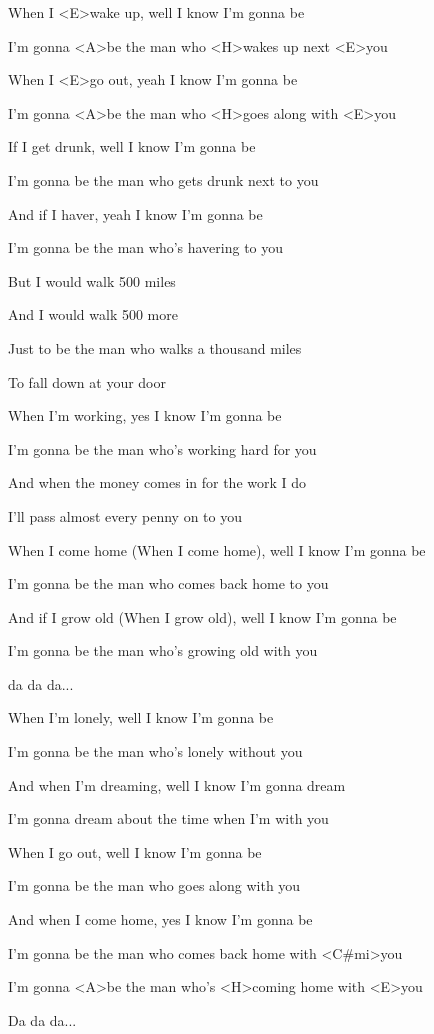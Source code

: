 

\zs
When I <E>wake up, well I know I'm gonna be

I'm gonna <A>be the man who <H>wakes up next <E>you

When I <E>go out, yeah I know I'm gonna be

I'm gonna <A>be the man who <H>goes along with <E>you

\ks

\zs
If I get drunk, well I know I'm gonna be

I'm gonna be the man who gets drunk next to you

And if I haver, yeah I know I'm gonna be

I'm gonna be the man who's havering to you
\ks

\zr
But I would walk 500 miles

And I would walk 500 more

Just to be the man who walks a thousand miles

To fall down at your door
\kr

\zs
When I'm working, yes I know I'm gonna be

I'm gonna be the man who's working hard for you

And when the money comes in for the work I do

I'll pass almost every penny on to you
\ks

\zs
When I come home (When I come home), well I know I'm gonna be

I'm gonna be the man who comes back home to you

And if I grow old (When I grow old), well I know I'm gonna be

I'm gonna be the man who's growing old with you
\ks

\zr \kr

da da da...


\zs
When I'm lonely, well I know I'm gonna be

I'm gonna be the man who's lonely without you

And when I'm dreaming, well I know I'm gonna dream

I'm gonna dream about the time when I'm with you
\ks

\zs
When I go out, well I know I'm gonna be

I'm gonna be the man who goes along with you

And when I come home, yes I know I'm gonna be

I'm gonna be the man who comes back home with <C#mi>you

I'm gonna <A>be the man who's <H>coming home with <E>you
\ks

\zr \kr

Da da da...

\zr \kr
\kp






















